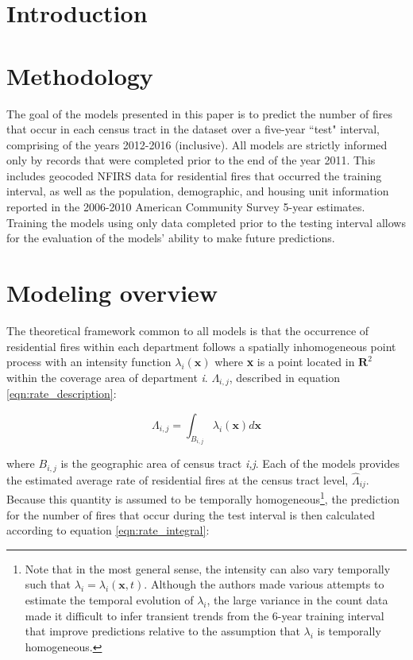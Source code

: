 \documentclass{svjour3}
\begin{document}
\abstract


\section{Introduction}
  
  
\section{Methodology}
The goal of the models presented in this paper is to predict the number of fires that occur in each census tract in the dataset over a five-year ``test" interval, comprising of the years 2012-2016 (inclusive). All models are strictly informed only by records that were completed prior to the end of the year 2011. This includes geocoded NFIRS data for residential fires that occurred the training interval, as well as the population, demographic, and housing unit information reported in the 2006-2010 American Community Survey 5-year estimates. Training the models using only data completed prior to the testing interval allows for the evaluation of the models' ability to make future predictions.


\section{Modeling overview}
The theoretical framework common to all models is that the occurrence of residential fires within each department follows a spatially inhomogeneous point process with an intensity function $\lambda_{i}(\textbf{x})$ 
where \textbf{x} is a point located in $\textbf{R}^2$ within the coverage area of department \textit{i}. $\Lambda_{i,j}$, described in equation \ref{eqn:rate_description}:

\begin{equation}
  \label{eqn:rate_description}
  \Lambda_{i,j} = \int_{B_{i,j}} \lambda_{i}(\textbf{x})d\textbf{x}
\end{equation}

\noindent where $B_{i,j}$ is the geographic area of census tract \textit{i,j}. Each of the models provides the estimated average rate of residential fires at the census tract level, $\hat\Lambda_{ij}$. Because this quantity is assumed to be temporally homogeneous\footnote{Note that in the most general sense, the intensity can also vary temporally such that $\lambda_i = \lambda_i(\textbf{x},t)$. Although the authors made various attempts to estimate the temporal evolution of $\lambda_i$, the large variance in the count data made it difficult to infer transient trends from the 6-year training interval that improve predictions relative to the assumption that $\lambda_i$ is temporally homogeneous.}, the prediction for the number of fires that occur during the test interval is then calculated according to equation \ref{eqn:rate_integral}: 
\end{document}
